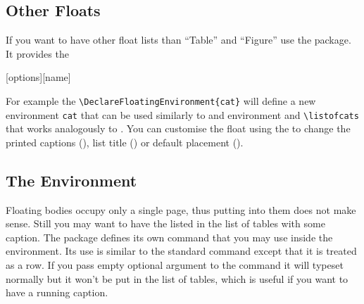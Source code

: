 \subsection{Other Floats}

If you want to have other float lists than \enquote{Table} and \enquote{Figure}
use the  package. It provides the
\begin{lscommand}
  [options][name]
\end{lscommand}
For example the \verb|\DeclareFloatingEnvironment{cat}| will define a new
environment \verb|cat| that can be used similarly to  and 
environment and \verb|\listofcats| that works analogously to .
You can customise the float using the  to change the printed
captions (), list title () or default placement
().

\subsection{The  Environment}

Floating bodies occupy only a single page, thus putting  into
them does not make sense. Still you may want to have the  listed
in the list of tables with some caption. The  package defines
its own  command that you may use inside the environment. Its use
is similar to the standard  command except that it is treated as a
row. If you pass empty optional argument to the  command it will
typeset normally but it won't be put in the list of tables, which is useful if
you want to have a running caption.

